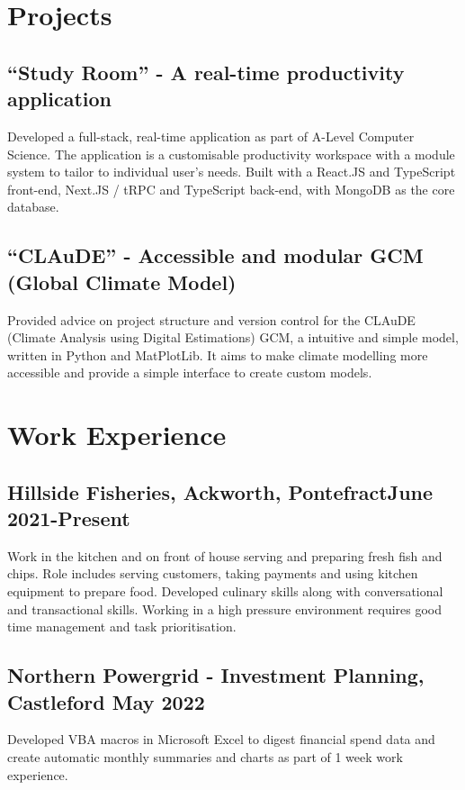 \documentclass[9pt]{extarticle}
\begin{document}
\begin{minipage}{0.6\textwidth}
	\raggedright
	\section{Projects}
	\subsection{``Study Room'' - A real-time productivity application}
	Developed a full-stack, real-time application as part of A-Level Computer Science.
	The application is a customisable productivity workspace with a module system to tailor to individual user's needs.
	Built with a React.JS and TypeScript front-end, Next.JS / tRPC and TypeScript back-end, with MongoDB as the core database.
	\vspace{.3cm}
	\subsection{``CLAuDE'' - Accessible and modular GCM (Global Climate Model)}
	Provided advice on project structure and version control for the CLAuDE (Climate Analysis using Digital Estimations) GCM, a intuitive and simple model, written in Python and MatPlotLib.
	It aims to make climate modelling more accessible and provide a simple interface to create custom models.

	\vspace{.3cm}
	\section{Work Experience}
	\subsection{Hillside Fisheries, Ackworth, Pontefract\hfill June 2021-Present}
	Work in the kitchen and on front of house serving and preparing fresh fish and chips. Role includes serving customers, taking payments and using kitchen equipment to prepare food. Developed culinary skills along with conversational and transactional skills. Working in a high pressure environment requires good time management and task prioritisation.

	\vspace{.3cm}

	\subsection{Northern Powergrid - Investment Planning, Castleford \hfill May 2022}
	Developed VBA macros in Microsoft Excel to digest financial spend data and create automatic monthly summaries and charts as part of 1 week work experience.
	\vspace{.3cm}


\end{minipage}
\end{document}
